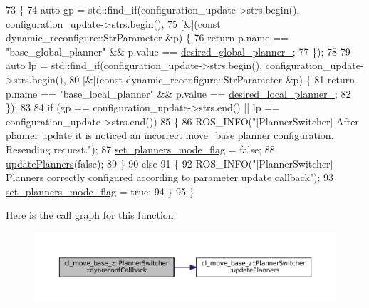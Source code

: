 \begin{DoxyCode}
73 \{
74   \textcolor{keyword}{auto} gp = std::find\_if(configuration\_update->strs.begin(), configuration\_update->strs.begin(),
75                          [&](\textcolor{keyword}{const} dynamic\_reconfigure::StrParameter &p) \{
76                            \textcolor{keywordflow}{return} p.name == \textcolor{stringliteral}{"base\_global\_planner"} && p.value == 
      \hyperlink{classcl__move__base__z_1_1PlannerSwitcher_aef047d3778b2993c1df146bbad43e03d}{desired\_global\_planner\_};
77                          \});
78 
79   \textcolor{keyword}{auto} lp = std::find\_if(configuration\_update->strs.begin(), configuration\_update->strs.begin(),
80                          [&](\textcolor{keyword}{const} dynamic\_reconfigure::StrParameter &p) \{
81                            \textcolor{keywordflow}{return} p.name == \textcolor{stringliteral}{"base\_local\_planner"} && p.value == 
      \hyperlink{classcl__move__base__z_1_1PlannerSwitcher_a6cbf65f11bb69125f913caaabdf7b4cf}{desired\_local\_planner\_};
82                          \});
83 
84   \textcolor{keywordflow}{if} (gp == configuration\_update->strs.end() || lp == configuration\_update->strs.end())
85   \{
86     ROS\_INFO(\textcolor{stringliteral}{"[PlannerSwitcher] After planner update it is noticed an incorrect move\_base planner
       configuration. Resending request."});
87     \hyperlink{classcl__move__base__z_1_1PlannerSwitcher_a6c14fd001513787ed213704e2d3dc383}{set\_planners\_mode\_flag} = \textcolor{keyword}{false};
88     \hyperlink{classcl__move__base__z_1_1PlannerSwitcher_a146641f63aea3185daab4c5cbb789550}{updatePlanners}(\textcolor{keyword}{false});
89   \}
90   \textcolor{keywordflow}{else}
91   \{
92     ROS\_INFO(\textcolor{stringliteral}{"[PlannerSwitcher] Planners correctly configured according to parameter update callback"});
93     \hyperlink{classcl__move__base__z_1_1PlannerSwitcher_a6c14fd001513787ed213704e2d3dc383}{set\_planners\_mode\_flag} = \textcolor{keyword}{true};
94   \}
95 \}
\end{DoxyCode}
Here is the call graph for this function\+:
\nopagebreak
\begin{figure}[H]
\begin{center}
\leavevmode
\includegraphics[width=350pt]{classcl__move__base__z_1_1PlannerSwitcher_ad9371bd8d62600ef874e8914c3ec177b_cgraph}
\end{center}
\end{figure}
